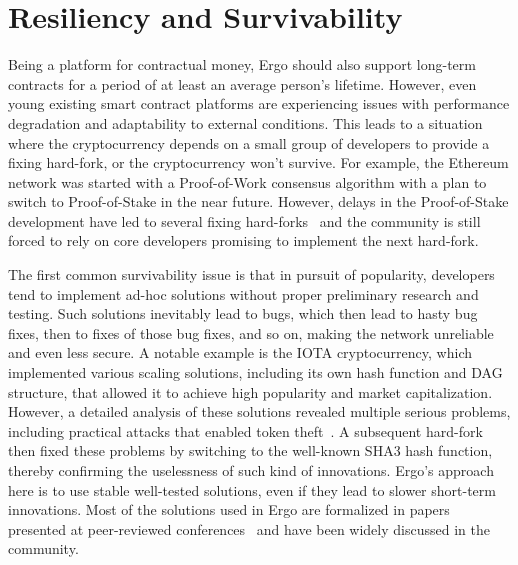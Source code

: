 \section{Resiliency and Survivability}
\label{sec:survivability}

Being a platform for contractual money, Ergo should also support long-term contracts for a period of at least an average person's lifetime.
However, even young existing smart contract platforms are experiencing issues with performance degradation and adaptability to external conditions.
This leads to a situation where the cryptocurrency depends on a small group of developers to provide a fixing hard-fork, or the cryptocurrency won't survive.
For example, the Ethereum network was started with a Proof-of-Work consensus algorithm with a plan to switch to Proof-of-Stake in the near future.
However, delays in the Proof-of-Stake development have led to several fixing hard-forks~\cite{ethDifficultyBomb} and the community is still forced to rely on core developers promising to implement the next hard-fork.


The first common survivability issue is that in pursuit of popularity, developers tend to implement ad-hoc solutions without proper preliminary research and testing.
Such solutions inevitably lead to bugs, which then lead to hasty bug fixes, then to fixes of those bug fixes, and so on, making the network unreliable and even less secure.
A notable example is the IOTA cryptocurrency, which implemented various scaling solutions, including its own hash function and DAG structure, that allowed it to achieve high popularity and market capitalization.
However, a detailed analysis of these solutions revealed multiple serious problems, including practical attacks that enabled token theft~\cite{heilmancryptanalysis, de2018break}.
A subsequent hard-fork~\cite{IOTAReport} then fixed these problems by switching to the well-known SHA3 hash function, thereby confirming the uselessness of such kind of innovations.
Ergo's approach here is to use stable well-tested solutions, even if they lead to slower short-term innovations.
Most of the solutions used in Ergo are formalized in papers presented at peer-reviewed
conferences~\cite{reyzin2017improving,meshkov2017short,chepurnoy2018systematic,chepurnoy2018self,chepurnoy2018checking,duong2018multi}
and have been widely discussed in the community.


